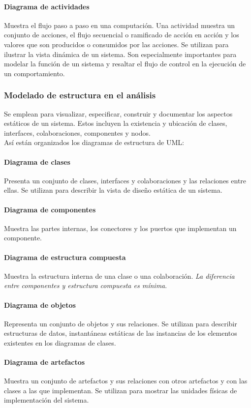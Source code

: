 \paragraph{Diagrama de actividades}
Muestra el flujo paso a paso en una computación. Una actividad muestra un conjunto de acciones, el flujo secuencial o ramificado de acción en acción y los valores que son producidos o consumidos por las acciones. Se utilizan para ilustrar la vista dinámica de un sistema. Son especialmente importantes para modelar la función de un sistema y resaltar el flujo de control en la ejecución de un comportamiento.
\subsubsection{Modelado de estructura en el análisis}
Se emplean para visualizar, especificar, construir y documentar los aspectos estáticos de un sistema. Estos incluyen la existencia y ubicación de clases, interfaces, colaboraciones, componentes y nodos.\\
Así están organizados los diagramas de estructura de UML:
\paragraph{Diagrama de clases}
Presenta un conjunto de clases, interfaces y colaboraciones y las relaciones entre ellas. Se utilizan para describir la vista de diseño estática de un sistema.
\paragraph{Diagrama de componentes}
Muestra las partes internas, los conectores y los puertos que implementan un componente.
\paragraph{Diagrama de estructura compuesta}
Muestra la estructura interna de una clase o una colaboración. \emph{La diferencia entre componentes y estructura compuesta es mínima}.
\paragraph{Diagrama de objetos}
Representa un conjunto de objetos y sus relaciones. Se utilizan para describir estructuras de datos, instantáneas estáticas de las instancias de los elementos existentes en los diagramas de clases.
\paragraph{Diagrama de artefactos}
Muestra un conjunto de artefactos y sus relaciones con otros artefactos y con las clases a las que implementan. Se utilizan para mostrar las unidades físicas de implementación del sistema.
